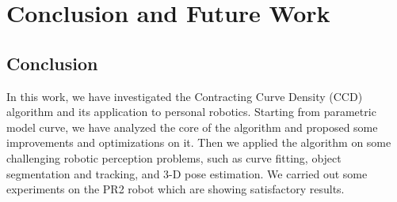 
\chapter{Conclusion and  Future Work}
\label{chapter:conclusion}

\section{Conclusion}
\label{sec:con}

In this work, we have investigated the Contracting Curve Density (CCD)
algorithm and its application to personal robotics. Starting from
parametric model curve, we have analyzed the core of the algorithm and
proposed some improvements and optimizations on it. Then we applied the
algorithm on some challenging robotic perception problems, such as curve
fitting, object segmentation and tracking, and 3-D pose estimation. We
carried out some experiments on the PR2 robot which are showing satisfactory results. 

